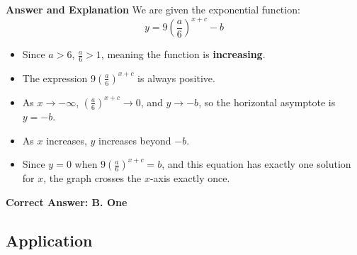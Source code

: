 \documentclass{beamer}
\begin{document}
\begin{frame}{\textbf{Answer and Explanation}}
We are given the exponential function:
\[
y = 9\left(\frac{a}{6}\right)^{x + c} - b
\]

\begin{itemize}
    \item Since $a > 6$, $\frac{a}{6} > 1$, meaning the function is \textbf{increasing}.
    \item The expression $9\left(\frac{a}{6}\right)^{x + c}$ is always positive.
    \item As $x \to -\infty$, $\left(\frac{a}{6}\right)^{x + c} \to 0$, and $y \to -b$, so the horizontal asymptote is $y = -b$.
    \item As $x$ increases, $y$ increases beyond $-b$.
    \item Since $y = 0$ when $9\left(\frac{a}{6}\right)^{x + c} = b$, and this equation has exactly one solution for $x$, the graph crosses the $x$-axis exactly once.
\end{itemize}

\textbf{Correct Answer: B. One}
\end{frame}

\begin{frame}
\section{Application}
\end{frame}
\end{document}
